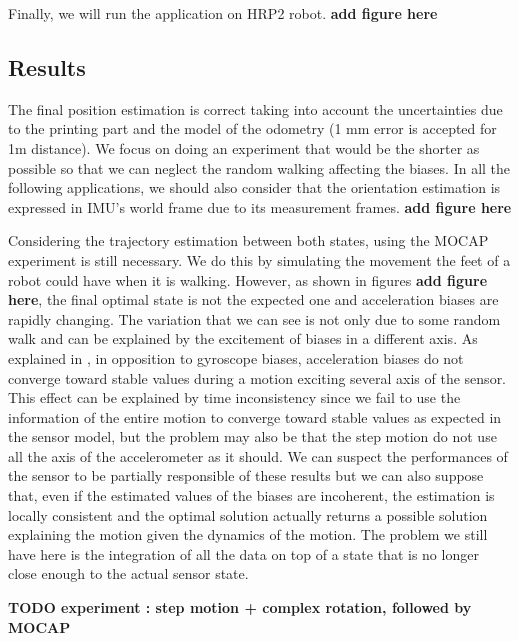 Finally, we will run the application on HRP2 robot. \textbf{add figure here}

\subsection{Results}

The final position estimation is correct taking into account the uncertainties due to the printing part and the model of the odometry (1 mm error is accepted for 1m distance). We focus on doing an experiment that would be the shorter as possible
so that we can neglect the random walking affecting the biases. 
In all the following applications, we should also consider that the orientation estimation is expressed in IMU's world frame due to its measurement frames. \textbf{add figure here}

Considering the trajectory estimation between both states, using the MOCAP experiment is still necessary. We do this by simulating the movement the feet of a robot could have when it is walking. However, as shown in figures \textbf{add figure here}, the final optimal state
is not the expected one and acceleration biases are rapidly changing. The variation that we can see is not only due to some random walk and can be explained by the excitement of biases in a different axis.
As explained in \cite{roussillon2011rt}, in opposition to gyroscope biases, acceleration biases do not converge toward stable values during a motion exciting several axis of the sensor. This effect can be explained by time inconsistency since we fail
to use the information of the entire motion to converge toward stable values as expected in the sensor model, but the problem may also be that the step motion do not use all the axis of the accelerometer as it should.
We can suspect the performances of the sensor to be partially responsible of these results but we can also suppose that, even if the estimated values of the biases are incoherent, the estimation is locally consistent and the optimal solution actually
returns a possible solution explaining the motion given the dynamics of the motion. The problem we still have here is the integration of all the data on top of a state that is no longer close enough to the actual sensor state.


\textbf{TODO experiment : step motion + complex rotation, followed by MOCAP}


